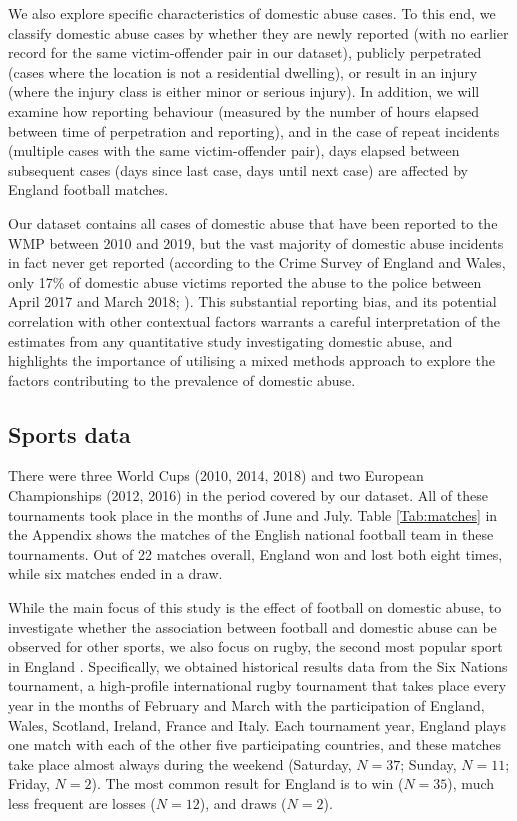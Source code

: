 \documentclass[12pt, a4paper]{article}
\begin{document}
We also explore specific characteristics of domestic abuse cases. To this end, we classify domestic abuse cases by whether they are newly reported (with no earlier record for the same victim-offender pair in our dataset), publicly perpetrated (cases where the location is not a residential dwelling), or result in an injury (where the injury class is either minor or serious injury). In addition, we will examine how reporting behaviour (measured by the number of hours elapsed between time of perpetration and reporting), and in the case of repeat incidents (multiple cases with the same victim-offender pair), days elapsed between subsequent cases (days since last case, days until next case) are affected by England football matches.



Our dataset contains all cases of domestic abuse that have been reported to the WMP between 2010 and 2019, but the vast majority of domestic abuse incidents in fact never get reported (according to the Crime Survey of England and Wales, only 17\% of domestic abuse victims reported the abuse to the police between April 2017 and March 2018; ). This substantial reporting bias, and its potential correlation with other contextual factors warrants a careful interpretation of the estimates from any quantitative study investigating domestic abuse, and highlights the importance of utilising a mixed methods approach to explore the factors contributing to the prevalence of domestic abuse. 
  
 \subsection{Sports data}
 

 There were three World Cups (2010, 2014, 2018) and two European Championships (2012, 2016) in the period covered by our dataset. All of these tournaments took place in the months of June and July. Table \ref{Tab:matches} in the Appendix shows the matches of the English national football team in these tournaments. Out of 22 matches overall, England won and lost both eight times, while six matches ended in a draw. 

While the main focus of this study is the effect of football on domestic abuse, to investigate whether the association between football and domestic abuse can be observed for other sports, we also focus on rugby, the second most popular sport in England \cite{Ipsos2003}. Specifically, we obtained historical results data from the Six Nations tournament, a high-profile international rugby tournament that takes place every year in the months of February and March with the participation of England, Wales, Scotland, Ireland, France and Italy. Each tournament year, England plays one match with each of the other five participating countries, and these matches take place almost always during the weekend (Saturday, $N = 37$; Sunday, $N = 11$; Friday, $N = 2$). The most common result for England is to win ($N = 35$), much less frequent are losses ($N = 12$), and draws ($N = 2$).
\end{document}
